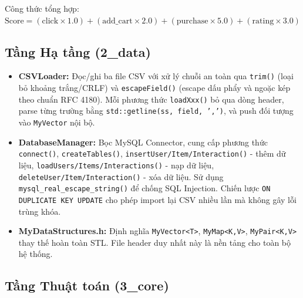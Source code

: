 \documentclass{report}
\begin{document}
Công thức tổng hợp:\newline
$\text{Score} = (\text{click} \times 1.0) + (\text{add\_cart} \times 2.0) + (\text{purchase} \times 5.0) + (\text{rating} \times 3.0)$

\subsection{Tầng Hạ tầng (2\_data)}

\begin{itemize}
    \item \textbf{CSVLoader:} Đọc/ghi ba file CSV với xử lý chuỗi an toàn qua \texttt{trim()} (loại bỏ khoảng trắng/CRLF) và \texttt{escapeField()} (escape dấu phẩy và ngoặc kép theo chuẩn RFC 4180). Mỗi phương thức \texttt{loadXxx()} bỏ qua dòng header, parse từng trường bằng \texttt{std::getline(ss, field, ',')}, và push đối tượng vào \texttt{MyVector} nội bộ.
    \item \textbf{DatabaseManager:} Bọc MySQL Connector, cung cấp phương thức \texttt{connect()}, \texttt{createTables()}, \texttt{insertUser/Item/Interaction()} - thêm dữ liệu, \texttt{loadUsers/Items/Interactions()} - nạp dữ liệu, \texttt{deleteUser/Item/Interaction()} - xóa dữ liệu. Sử dụng \texttt{mysql\_real\_escape\_string()} để chống SQL Injection. Chiến lược \texttt{ON DUPLICATE KEY UPDATE} cho phép import lại CSV nhiều lần mà không gây lỗi trùng khóa.
    \item \textbf{MyDataStructures.h:} Định nghĩa \texttt{MyVector<T>}, \texttt{MyMap<K,V>}, \texttt{MyPair<K,V>} thay thế hoàn toàn STL. File header duy nhất này là nền tảng cho toàn bộ hệ thống.
\end{itemize}

\subsection{Tầng Thuật toán (3\_core)}
\end{document}
